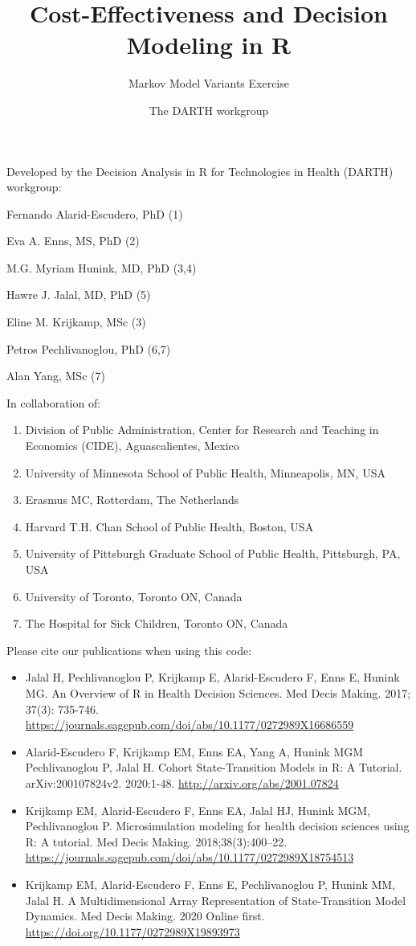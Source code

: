 \documentclass[
]{article}
\title{Cost-Effectiveness and Decision Modeling in R}
\subtitle{Markov Model Variants Exercise}
\author{The DARTH workgroup}
\date{}
\providecommand{\tightlist}{%
  \setlength{\itemsep}{0pt}\setlength{\parskip}{0pt}}
\begin{document}
\maketitle

Developed by the Decision Analysis in R for Technologies in Health
(DARTH) workgroup:

Fernando Alarid-Escudero, PhD (1)

Eva A. Enns, MS, PhD (2)

M.G. Myriam Hunink, MD, PhD (3,4)

Hawre J. Jalal, MD, PhD (5)

Eline M. Krijkamp, MSc (3)

Petros Pechlivanoglou, PhD (6,7)

Alan Yang, MSc (7)

In collaboration of:

\begin{enumerate}
\def\labelenumi{\arabic{enumi}.}
\tightlist
\item
  Division of Public Administration, Center for Research and Teaching in
  Economics (CIDE), Aguascalientes, Mexico
\item
  University of Minnesota School of Public Health, Minneapolis, MN, USA
\item
  Erasmus MC, Rotterdam, The Netherlands
\item
  Harvard T.H. Chan School of Public Health, Boston, USA
\item
  University of Pittsburgh Graduate School of Public Health, Pittsburgh,
  PA, USA
\item
  University of Toronto, Toronto ON, Canada
\item
  The Hospital for Sick Children, Toronto ON, Canada
\end{enumerate}

Please cite our publications when using this code:

\begin{itemize}
\item
  Jalal H, Pechlivanoglou P, Krijkamp E, Alarid-Escudero F, Enns E,
  Hunink MG. An Overview of R in Health Decision Sciences. Med Decis
  Making. 2017; 37(3): 735-746.
  \url{https://journals.sagepub.com/doi/abs/10.1177/0272989X16686559}
\item
  Alarid-Escudero F, Krijkamp EM, Enns EA, Yang A, Hunink MGM
  Pechlivanoglou P, Jalal H. Cohort State-Transition Models in R: A
  Tutorial. arXiv:200107824v2. 2020:1-48.
  \url{http://arxiv.org/abs/2001.07824}
\item
  Krijkamp EM, Alarid-Escudero F, Enns EA, Jalal HJ, Hunink MGM,
  Pechlivanoglou P. Microsimulation modeling for health decision
  sciences using R: A tutorial. Med Decis Making. 2018;38(3):400--22.
  \url{https://journals.sagepub.com/doi/abs/10.1177/0272989X18754513}
\item
  Krijkamp EM, Alarid-Escudero F, Enns E, Pechlivanoglou P, Hunink MM,
  Jalal H. A Multidimensional Array Representation of State-Transition
  Model Dynamics. Med Decis Making. 2020 Online first.
  \url{https://doi.org/10.1177/0272989X19893973}
\end{itemize}
\end{document}
